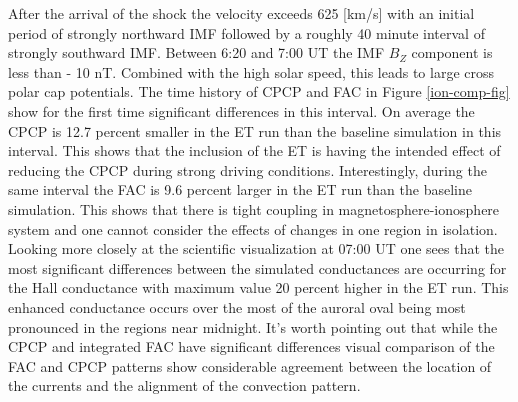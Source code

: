 \documentclass[draft,jgrga]{agutex}
\begin{document}
\begin{article}
After the arrival of the shock the velocity exceeds 625 [km/s] with an initial period of strongly northward IMF followed by a roughly 40 minute interval of strongly southward IMF.  Between 6:20 and 7:00 UT the IMF $B_Z$ component is less than - 10 nT.  Combined with the high solar speed, this leads to large cross polar cap potentials.   The time history of CPCP and FAC in Figure \ref{ion-comp-fig} show for the first time significant differences in this interval.  On average the CPCP is 12.7 percent smaller in the ET run than the baseline simulation in this interval.  This shows that the inclusion of the ET is having the intended effect of reducing the CPCP during strong driving conditions.  Interestingly, during the same interval the FAC is 9.6 percent larger in the ET run than the baseline simulation.  This shows that there is tight coupling in magnetosphere-ionosphere system and one cannot consider the effects of changes in one region in isolation.  Looking more closely at the scientific visualization at 07:00 UT one sees that the most significant differences between the simulated conductances are occurring for the Hall conductance with maximum value 20 percent higher in the ET run.  This enhanced conductance occurs over the most of the auroral oval being most pronounced in the regions near midnight.  It's worth pointing out that while the CPCP and integrated FAC have significant differences visual comparison of the FAC and CPCP patterns show considerable agreement between the location of the currents and the alignment of the convection pattern.


\end{article}
\end{document}
